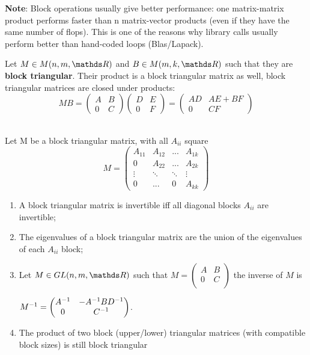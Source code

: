 \documentclass[computationalMathematics.tex]{subfiles}
\begin{document}
\textbf{Note}: Block operations usually give better performance: one
matrix-matrix product performs faster than n matrix-vector
products (even if they have the same number of flops).
This is one of the reasons why library calls usually perform better
than hand-coded loops (Blas/Lapack).

\begin{proposition}
  Let $M \in M(n, m, \R)$ and $B \in M(m, k, \R)$ such that they are \textbf{block triangular}.
  Their product is a block triangular matrix as well, block triangular matrices
are closed under products:
  $$M B 
  = \begin{pmatrix}
    A & B\\
    0 & C
  \end{pmatrix}
  \begin{pmatrix}
    D & E\\
    0 & F
  \end{pmatrix}
  = 
  \begin{pmatrix}
    AD & AE + BF\\
    0 & CF
  \end{pmatrix}$$
\end{proposition}

\begin{proposition}~\\
    Let M be a block triangular matrix, with all $A_{ii}$ square
    $$M 
      = \begin{pmatrix}
        A_{11}  & A_{12} & ... & A_{1k}\\
        0       & A_{22} & ... & A_{2k}\\
        \vdots  &\ddots & \ddots & \vdots\\
        0       & ... & 0 & A_{kk}
      \end{pmatrix}$$ 
    \begin{enumerate}
      \item A block triangular matrix is invertible iff all diagonal blocks $A_{ii}$ are invertible;
      \item The eigenvalues of a block triangular matrix are the union of the eigenvalues of each $A_{ii}$ block;
      \item Let $M \in GL(n, m, \R)$ such that $M= 
        \begin{pmatrix}
          A & B\\
          0 & C\\
        \end{pmatrix}$ 
       the inverse of $M$ is 
        
        ${M}^{-1} = 
        \begin{pmatrix}
          {A}^{-1} & -{A}^{-1}B{D}^{-1}\\
          0 & {C}^{-1}
        \end{pmatrix}$.
      \item The product of two block (upper/lower) triangular matrices
(with compatible block sizes) is still block triangular
    \end{enumerate}
  \end{proposition}
\end{document}
